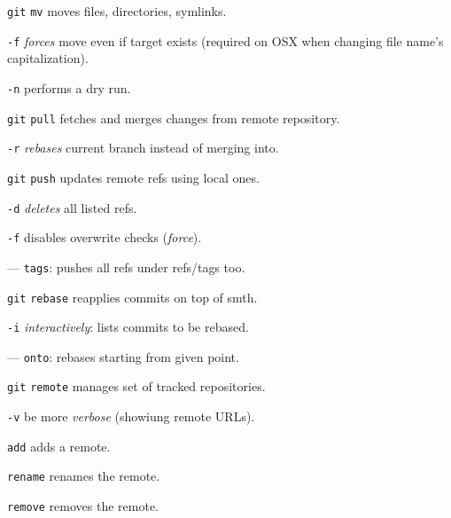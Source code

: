 \documentclass{reference_card}
\begin{document}
\begin{multicols*}{3}
\begin{compactenum}
\item [\texttt{git}] \texttt{mv} moves files, directories, symlinks.
\item [\texttt{-f}] \emph{forces} move even if target exists (required on OSX when changing file name's capitalization).
\item [\texttt{-n}] performs a dry run.
\end{compactenum}

\begin{compactenum}
\item [\texttt{git}] \texttt{pull} fetches and merges changes from remote repository.
\item [\texttt{-r}] \emph{rebases} current branch instead of merging into.
\end{compactenum}

\begin{compactenum}
\item [\texttt{git}] \texttt{push} updates remote refs using local ones.
\item [\texttt{-d}] \emph{deletes} all listed refs.
\item [\texttt{-f}] disables overwrite checks (\emph{force}).
\item [---] \texttt{tags}: pushes all refs under refs/tags too.
\end{compactenum}

\begin{compactenum}
\item [\texttt{git}] \texttt{rebase} reapplies commits on top of smth.
\item [\texttt{-i}] \emph{interactively}: lists commits to be rebased.
\item [---] \texttt{onto}: rebases starting from given point.
\end{compactenum}

\begin{compactenum}
\item [\texttt{git}] \texttt{remote} manages set of tracked repositories.
\item [\texttt{-v}] be more \emph{verbose} (showiung remote URLs).
\item [\scriptsize \texttt{add}] adds a remote.
\item [\scriptsize \texttt{rename}] renames the remote.
\item [\scriptsize \texttt{remove}] removes the remote.
\end{compactenum}


\end{multicols*}
\end{document}
